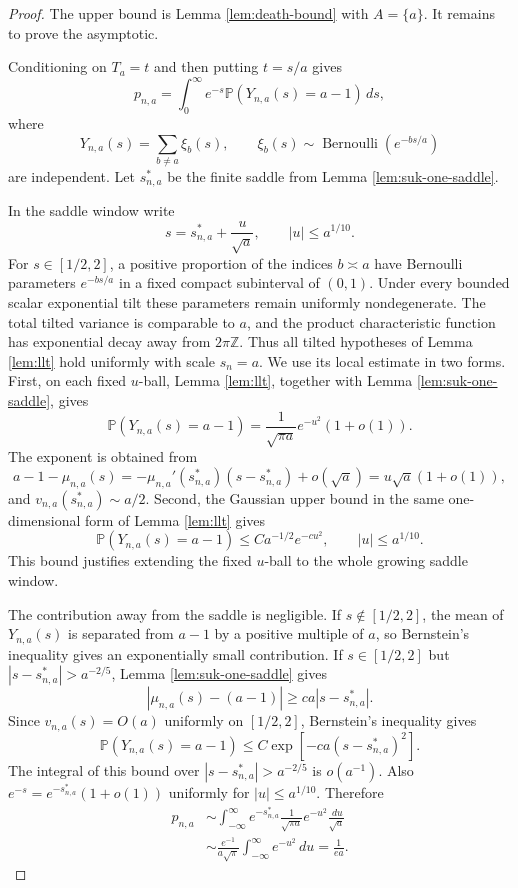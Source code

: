 \documentclass[11pt]{article}
\theoremstyle{remark}
\newcommand{\Pp}{\mathbb P}
\newcommand{\dd}{\,d}
\begin{document}
\begin{proof}
The upper bound is Lemma \ref{lem:death-bound} with \(A=\{a\}\).  It remains to prove the asymptotic.

Conditioning on \(T_a=t\) and then putting \(t=s/a\) gives
\[
        p_{n,a}=\int_0^\infty e^{-s}
        \Pp(Y_{n,a}(s)=a-1)\dd s,
\]
where
\[
        Y_{n,a}(s)=\sum_{b\ne a}\xi_b(s),
        \qquad \xi_b(s)\sim\operatorname{Bernoulli}(e^{-bs/a})
\]
are independent.  Let \(s_{n,a}^*\) be the finite saddle from Lemma \ref{lem:suk-one-saddle}.

In the saddle window write
\[
        s=s_{n,a}^*+\frac{u}{\sqrt a},
        \qquad |u|\le a^{1/10}.
\]
For $s\in[1/2,2]$, a positive proportion of the indices $b\asymp a$ have
Bernoulli parameters $e^{-bs/a}$ in a fixed compact subinterval of $(0,1)$.
Under every bounded scalar exponential tilt these parameters remain uniformly
nondegenerate.  The total tilted variance is comparable to $a$, and the product
characteristic function has exponential decay away from $2\pi\mathbb Z$.
Thus all tilted hypotheses of Lemma \ref{lem:llt} hold uniformly with scale
$s_n=a$.  We use its local estimate in two forms.  First, on each fixed
\(u\)-ball, Lemma \ref{lem:llt}, together with Lemma
\ref{lem:suk-one-saddle}, gives
\[
        \Pp(Y_{n,a}(s)=a-1)
        =\frac{1}{\sqrt{\pi a}}e^{-u^2}(1+o(1)).
\]
The exponent is obtained from
\[
        a-1-\mu_{n,a}(s)
        =-\mu_{n,a}'(s_{n,a}^*)(s-s_{n,a}^*)+o(\sqrt a)
        =u\sqrt a(1+o(1)),
\]
and \(v_{n,a}(s_{n,a}^*)\sim a/2\).  Second, the Gaussian upper bound in the same one-dimensional form of Lemma \ref{lem:llt} gives
\[
        \Pp(Y_{n,a}(s)=a-1)
        \le C a^{-1/2}e^{-c u^2},
        \qquad |u|\le a^{1/10}.
\]
This bound justifies extending the fixed \(u\)-ball to the whole growing saddle window.

The contribution away from the saddle is negligible.  If \(s\notin[1/2,2]\), the mean of \(Y_{n,a}(s)\) is separated from \(a-1\) by a positive multiple of \(a\), so Bernstein's inequality gives an exponentially small contribution.  If \(s\in[1/2,2]\) but \(|s-s_{n,a}^*|>a^{-2/5}\), Lemma \ref{lem:suk-one-saddle} gives
\[
        |\mu_{n,a}(s)-(a-1)|
        \ge c a |s-s_{n,a}^*|.
\]
Since \(v_{n,a}(s)=O(a)\) uniformly on \([1/2,2]\), Bernstein's inequality gives
\[
        \Pp(Y_{n,a}(s)=a-1)
        \le C\exp[-c a(s-s_{n,a}^*)^2].
\]
The integral of this bound over \(|s-s_{n,a}^*|>a^{-2/5}\) is \(o(a^{-1})\).  Also \(e^{-s}=e^{-s_{n,a}^*}(1+o(1))\) uniformly for \(|u|\le a^{1/10}\).  Therefore
\[
\begin{aligned}
        p_{n,a}
        &\sim \int_{-\infty}^{\infty}
        e^{-s_{n,a}^*}
        \frac{1}{\sqrt{\pi a}}e^{-u^2}\frac{\dd u}{\sqrt a}  \\
        &\sim \frac{e^{-1}}{a\sqrt\pi}\int_{-\infty}^{\infty}e^{-u^2}\dd u
        =\frac1{ea}.
\end{aligned}
\]
\end{proof}
\end{document}
